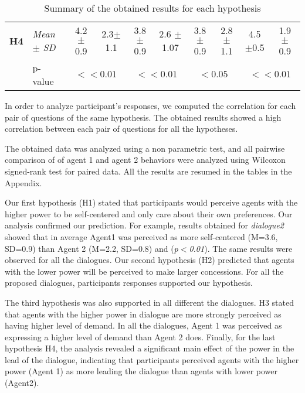 \documentclass{llncs}
\begin{document}
\begin{table}[t]
\begin{tabular}{|ll|c|c|c|c|c|c|c|c|}
			
			\newline \multirow{2}{*} {\textbf{H4}} & \multicolumn{1}{|l|}{ \textit{Mean} $\pm$ \textit{SD} } & 4.2 $\pm$ 0.9 & 2.3$\pm$ 1.1  & 3.8 $\pm$0.9 & 2.6 $\pm$1.07 & 3.8 $\pm$0.9  & 2.8$\pm$ 1.1  & 4.5 $\pm$0.5  & 1.9 $\pm$ 0.9\\
			\cline{2-10}
			\newline & \multicolumn{1}{|l|}{p-value} & \multicolumn{2}{c|}{ $<<0.01$} & \multicolumn{2}{c|}{ $<<0.01$} & \multicolumn{2}{c|}{ $<0.05$}& \multicolumn{2}{c|}{ $<<0.01$}\\
			\hline	
		\end{tabular}
		\caption{Summary of the obtained results for each hypothesis}
	\end{table}
	In order to analyze participant's responses, we computed the correlation for each pair of questions of the same hypothesis. The obtained results showed a high correlation between each pair of questions for all the hypotheses.
	
	The obtained data was analyzed using a non parametric test, and all pairwise comparison of of agent 1 and agent 2 behaviors were analyzed using Wilcoxon signed-rank test for paired data. All the results are resumed in the tables in the Appendix.
	
	\par Our first hypothesis (H1) stated that participants would perceive agents with the higher power to be self-centered and only care about their own preferences. Our analysis confirmed our prediction. For example, results obtained for \textit{dialogue2} showed that in average Agent1 was perceived as more self-centered (M=3.6, SD=0.9) than Agent 2 (M=2.2, SD=0.8) and (\textit{p$<$0.01}). The same results were observed for all the dialogues. 
	Our second hypothesis (H2) predicted that agents with the lower power will be perceived to make larger concessions. For all the proposed dialogues, participants responses supported our hypothesis. 

	\par The third hypothesis was also supported in all different the dialogues. H3 stated that agents with the higher power in dialogue are more strongly perceived as having higher level of demand. In all the dialogues, Agent 1 was perceived as expressing a higher level of demand than Agent 2 does. 
	Finally, for the last hypothesis H4, the analysis revealed a significant main effect of the power in the lead of the dialogue, indicating that participants perceived agents with the higher power (Agent 1) as more leading the dialogue than agents with lower power (Agent2). 
	
\end{document}
